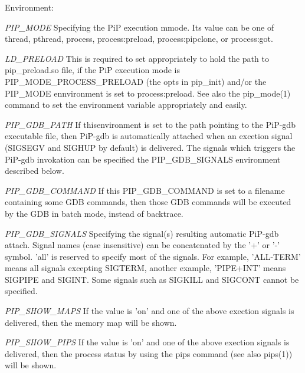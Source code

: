 \begin{DoxyParagraph}{Environment\-:}
\begin{DoxyItemize}
\item {\itshape P\-I\-P\-\_\-\-M\-O\-D\-E} Specifying the Pi\-P execution mmode. Its value can be one of {\ttfamily thread}, {\ttfamily pthread}, {\ttfamily process}, {\ttfamily process\-:preload}, {\ttfamily process\-:pipclone}, or {\ttfamily process\-:got}. \item {\itshape L\-D\-\_\-\-P\-R\-E\-L\-O\-A\-D} This is required to set appropriately to hold the path to {\ttfamily pip\-\_\-preload.\-so} file, if the Pi\-P execution mode is {\ttfamily P\-I\-P\-\_\-\-M\-O\-D\-E\-\_\-\-P\-R\-O\-C\-E\-S\-S\-\_\-\-P\-R\-E\-L\-O\-A\-D} (the {\ttfamily opts} in {\ttfamily pip\-\_\-init}) and/or the P\-I\-P\-\_\-\-M\-O\-D\-E ennvironment is set to {\ttfamily process\-:preload}. See also the pip\-\_\-mode(1) command to set the environment variable appropriately and easily. \item {\itshape P\-I\-P\-\_\-\-G\-D\-B\-\_\-\-P\-A\-T\-H} If thisenvironment is set to the path pointing to the Pi\-P-\/gdb executable file, then Pi\-P-\/gdb is automatically attached when an excetion signal (S\-I\-G\-S\-E\-G\-V and S\-I\-G\-H\-U\-P by default) is delivered. The signals which triggers the Pi\-P-\/gdb invokation can be specified the {\ttfamily P\-I\-P\-\_\-\-G\-D\-B\-\_\-\-S\-I\-G\-N\-A\-L\-S} environment described below. \item {\itshape P\-I\-P\-\_\-\-G\-D\-B\-\_\-\-C\-O\-M\-M\-A\-N\-D} If this P\-I\-P\-\_\-\-G\-D\-B\-\_\-\-C\-O\-M\-M\-A\-N\-D is set to a filename containing some G\-D\-B commands, then those G\-D\-B commands will be executed by the G\-D\-B in batch mode, instead of backtrace. \item {\itshape P\-I\-P\-\_\-\-G\-D\-B\-\_\-\-S\-I\-G\-N\-A\-L\-S} Specifying the signal(s) resulting automatic Pi\-P-\/gdb attach. Signal names (case insensitive) can be concatenated by the '+' or '-\/' symbol. 'all' is reserved to specify most of the signals. For example, 'A\-L\-L-\/\-T\-E\-R\-M' means all signals excepting {\ttfamily S\-I\-G\-T\-E\-R\-M}, another example, 'P\-I\-P\-E+\-I\-N\-T' means {\ttfamily S\-I\-G\-P\-I\-P\-E} and {\ttfamily S\-I\-G\-I\-N\-T}. Some signals such as S\-I\-G\-K\-I\-L\-L and S\-I\-G\-C\-O\-N\-T cannot be specified. \item {\itshape P\-I\-P\-\_\-\-S\-H\-O\-W\-\_\-\-M\-A\-P\-S} If the value is 'on' and one of the above exection signals is delivered, then the memory map will be shown. \item {\itshape P\-I\-P\-\_\-\-S\-H\-O\-W\-\_\-\-P\-I\-P\-S} If the value is 'on' and one of the above exection signals is delivered, then the process status by using the {\ttfamily pips} command (see also pips(1)) will be shown.\end{DoxyItemize}

\end{DoxyParagraph}
